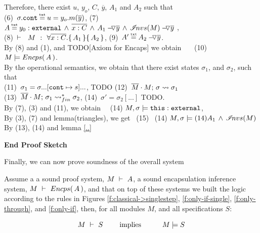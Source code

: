 \begin{description}
Therefore, there exist $u$, $y_o$, $C$, $\overline y$,  $A_1$ and $A_2$ such that \\
(6)\ $\sigma.\prg{cont}\txteq u=y_o.m(\overline y)$,  \hspace{2cm}
 (7)\ $A \txteq   { \external{y_0} }\, \wedge \, \overline {x:C}  \, \wedge \,  \PushAS  {y}{  A_1} \,   \wedge \,  \PushAS {y}{\extract{M}}\ $, 
\\
 (8)\ ${\vdash \ \ M\ \ \mathbf{:}\ \ \forall {\overline {x:C}}.\{\, A_1 \,\}\{\, A_2 \,\}}$,   \hspace{1cm}
 (9)\ $A' \txteq \PushAS  {y} { A_2}$. 
 \\
 By (8) and (1), and TODO[Axiom for Encaps] we obtain \ \ \ (10) \ $M \models {\ensuremath Encps(\, A\, )}$.
 \\
 By the operational semantics, we obtain that there exist states $\sigma_1$, and $\sigma_2$, such that \\
 (11)\ $\sigma_1=\sigma ...[\mbox{\normalfont{\texttt{cont}}}\mapsto s]... $, TODO   \hspace{1cm}
   (12)\ $\overline{M}\cdot M;\, {\sigma} \rightsquigarrow \sigma_1$ \\
 (13)\ $\overline{M}\cdot M;\, {\sigma_1} \rightsquigarrow^*_{fin} \sigma_2$,   \hspace{1cm}
 (14)\ $\sigma'=\sigma_2[...]$ TODO.
\\
By (7), (3) and (11), we obtain \ \ 
(14) $M, \sigma \models \mbox{\normalfont{\texttt{this}}}:\mbox{\normalfont{\texttt{external}}}$, %
\\
By (3), (7) and lemma(triangles), we get \ (15) \ (14) $M, \sigma \models (14)  {  A_1} \,   \wedge \,  {{\mathcal I}\!nvs(M)}$
By (13), (14) and lemma \ref{..}\ \  

\end{description}
\noindent
\vspace{.1cm}
  {\textbf{End Proof Sketch}} 

\vspace{1cm}

Finally, we can now prove soundness of the overall system

\begin{theorem}[Soundness]
\label{thm:soundness}
Assume a a sound \SpecO proof system, $M\ \vdash\ A$, 
a sound encapsulation inference system, $M\ \vdash\ {Encps(\, A\, )}$,
 and  that on top of these systems we built
 the \SpecLang logic according to the rules in Figures \ref{f:classical->singlestep},  \ref{f:only-if-single}, 
 \ref{f:only-through},  and \ref{f:only-if},   then, for    all modules $M$, and all \SpecLang specifications  $S$:
 
 $$\proves{M}{S}\ \ \ \ \ \ \ \mbox{implies}\ \ \ \ \ \  \ \ \ \satisfies{M}{S}$$
\end{theorem}

